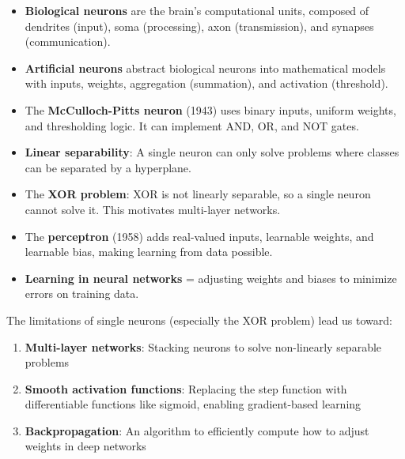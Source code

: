 \begin{itemize}
    \item \textbf{Biological neurons} are the brain's computational units, composed of dendrites (input), soma (processing), axon (transmission), and synapses (communication).
    
    \item \textbf{Artificial neurons} abstract biological neurons into mathematical models with inputs, weights, aggregation (summation), and activation (threshold).
    
    \item The \textbf{McCulloch-Pitts neuron} (1943) uses binary inputs, uniform weights, and thresholding logic. It can implement AND, OR, and NOT gates.
    
    \item \textbf{Linear separability}: A single neuron can only solve problems where classes can be separated by a hyperplane.
    
    \item The \textbf{XOR problem}: XOR is not linearly separable, so a single neuron cannot solve it. This motivates multi-layer networks.
    
    \item The \textbf{perceptron} (1958) adds real-valued inputs, learnable weights, and learnable bias, making learning from data possible.
    
    \item \textbf{Learning in neural networks} = adjusting weights and biases to minimize errors on training data.
\end{itemize}

\begin{bluebox}
The limitations of single neurons (especially the XOR problem) lead us toward:
\begin{enumerate}
    \item \textbf{Multi-layer networks}: Stacking neurons to solve non-linearly separable problems
    \item \textbf{Smooth activation functions}: Replacing the step function with differentiable functions like sigmoid, enabling gradient-based learning
    \item \textbf{Backpropagation}: An algorithm to efficiently compute how to adjust weights in deep networks
\end{enumerate}
\end{bluebox}

